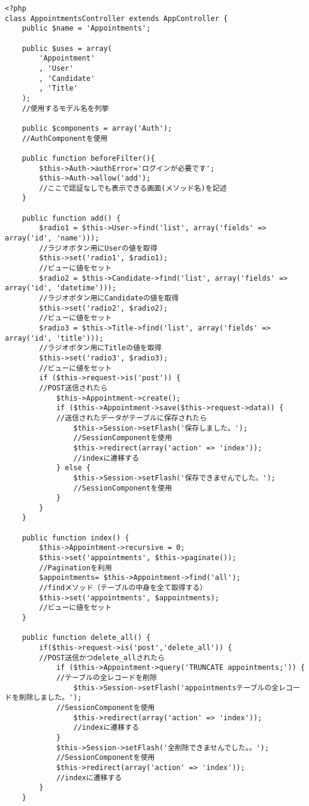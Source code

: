\documentclass{funthesis}
\begin{document}
\begin{lstlisting}[caption=AppointmentsController.php,label=1]
<?php
class AppointmentsController extends AppController {
	public $name = 'Appointments';

	public $uses = array(
		'Appointment' 
		, 'User'
		, 'Candidate'
		, 'Title'
	);
	//使用するモデル名を列挙

	public $components = array('Auth');
	//AuthComponentを使用

	public function beforeFilter(){
		$this->Auth->authError='ログインが必要です';
		$this->Auth->allow('add');
		//ここで認証なしでも表示できる画面(メソッド名)を記述
	}

	public function add() {
		$radio1 = $this->User->find('list', array('fields' => array('id', 'name')));
		//ラジオボタン用にUserの値を取得
		$this->set('radio1', $radio1);
		//ビューに値をセット
		$radio2 = $this->Candidate->find('list', array('fields' => array('id', 'datetime')));
		//ラジオボタン用にCandidateの値を取得
		$this->set('radio2', $radio2);
		//ビューに値をセット
		$radio3 = $this->Title->find('list', array('fields' => array('id', 'title')));
		//ラジオボタン用にTitleの値を取得
		$this->set('radio3', $radio3);
		//ビューに値をセット
		if ($this->request->is('post')) {
		//POST送信されたら
			$this->Appointment->create();
			if ($this->Appointment->save($this->request->data)) {
			//送信されたデータがテーブルに保存されたら
				$this->Session->setFlash('保存しました。');
				//SessionComponentを使用
				$this->redirect(array('action' => 'index'));
				//indexに遷移する
			} else {
				$this->Session->setFlash('保存できませんでした。');
				//SessionComponentを使用
			}
		}
	}

	public function index() {
		$this->Appointment->recursive = 0;
		$this->set('appointments', $this->paginate());
		//Paginationを利用
		$appointments= $this->Appointment->find('all');
		//findメソッド（テーブルの中身を全て取得する）
		$this->set('appointments', $appointments);
		//ビューに値をセット
	}

	public function delete_all() {
		if($this->request->is('post','delete_all')) {
		//POST送信かつdelete_allされたら
			if ($this->Appointment->query('TRUNCATE appointments;')) {
			//テーブルの全レコードを削除
				$this->Session->setFlash('appointmentsテーブルの全レコードを削除しました。');
			//SessionComponentを使用
				$this->redirect(array('action' => 'index'));
				//indexに遷移する
			}
			$this->Session->setFlash('全削除できませんでした。。');
			//SessionComponentを使用
			$this->redirect(array('action' => 'index'));
			//indexに遷移する
		}
	}


\end{lstlisting}
\end{document}
